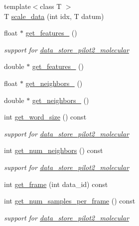 \begin{DoxyCompactItemize}
{\footnotesize template$<$class T $>$ }\\T \hyperlink{classlbann_1_1pilot2__molecular__reader_add998998fa16444e4509b08f79b291da}{scale\+\_\+data} (int idx, T datum)
\item 
float $\ast$ \hyperlink{classlbann_1_1pilot2__molecular__reader_a5d3bef36247e9279dc237826ac5ff322}{get\+\_\+features\+\_} ()
\begin{DoxyCompactList}\small\item\em support for \hyperlink{classlbann_1_1data__store__pilot2__molecular}{data\+\_\+store\+\_\+pilot2\+\_\+molecular} \end{DoxyCompactList}\item 
double $\ast$ \hyperlink{classlbann_1_1pilot2__molecular__reader_a6694fec3678fd8a883d5d8de6c2c74d5}{get\+\_\+features\+\_} ()
\item 
float $\ast$ \hyperlink{classlbann_1_1pilot2__molecular__reader_a5f3ad4f22a32db2af4a8136fdc0579eb}{get\+\_\+neighbors\+\_} ()
\item 
double $\ast$ \hyperlink{classlbann_1_1pilot2__molecular__reader_a9553eeece9aa1658cdc986b3ef803dea}{get\+\_\+neighbors\+\_} ()
\item 
int \hyperlink{classlbann_1_1pilot2__molecular__reader_abba5a68c484be69a441e5e9711356a46}{get\+\_\+word\+\_\+size} () const
\begin{DoxyCompactList}\small\item\em support for \hyperlink{classlbann_1_1data__store__pilot2__molecular}{data\+\_\+store\+\_\+pilot2\+\_\+molecular} \end{DoxyCompactList}\item 
int \hyperlink{classlbann_1_1pilot2__molecular__reader_a7c379056841cda42247ff518270bcfdf}{get\+\_\+num\+\_\+neighbors} () const
\begin{DoxyCompactList}\small\item\em support for \hyperlink{classlbann_1_1data__store__pilot2__molecular}{data\+\_\+store\+\_\+pilot2\+\_\+molecular} \end{DoxyCompactList}\item 
int \hyperlink{classlbann_1_1pilot2__molecular__reader_ac95223a0829a83a5d400c4d66efdcb93}{get\+\_\+frame} (int data\+\_\+id) const
\item 
int \hyperlink{classlbann_1_1pilot2__molecular__reader_a91e233f9878e93e31de2085cbcad1f10}{get\+\_\+num\+\_\+samples\+\_\+per\+\_\+frame} () const
\begin{DoxyCompactList}\small\item\em support for \hyperlink{classlbann_1_1data__store__pilot2__molecular}{data\+\_\+store\+\_\+pilot2\+\_\+molecular} \end{DoxyCompactList}\item 

\end{DoxyCompactItemize}

